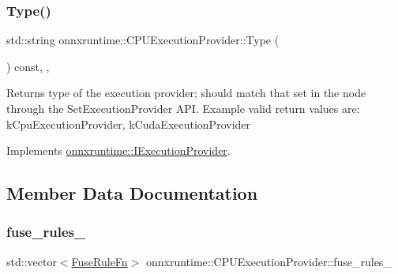 \mbox{\label{classonnxruntime_1_1CPUExecutionProvider_a419ca314cd97d0561226e90755b29da2}} 
\subsubsection{\texorpdfstring{Type()}{Type()}}
{\footnotesize\ttfamily std\+::string onnxruntime\+::\+C\+P\+U\+Execution\+Provider\+::\+Type (\begin{DoxyParamCaption}{ }\end{DoxyParamCaption}) const\hspace{0.3cm}{\ttfamily [inline]}, {\ttfamily [override]}, {\ttfamily [virtual]}}

\begin{DoxyReturn}{Returns}
type of the execution provider; should match that set in the node through the Set\+Execution\+Provider A\+PI. Example valid return values are\+: k\+Cpu\+Execution\+Provider, k\+Cuda\+Execution\+Provider 
\end{DoxyReturn}


Implements \mbox{\hyperlink{classonnxruntime_1_1IExecutionProvider_a6bfeb7af172299bcc6083a418b01fac1}{onnxruntime\+::\+I\+Execution\+Provider}}.



\subsection{Member Data Documentation}
\mbox{\label{classonnxruntime_1_1CPUExecutionProvider_a193342bb5a357f5dc4191c671042aaeb}} 
\subsubsection{\texorpdfstring{fuse\+\_\+rules\+\_\+}{fuse\_rules\_}}
{\footnotesize\ttfamily std\+::vector$<$\mbox{\hyperlink{namespaceonnxruntime_a916d9c71f5b38a56c21340f816954b88}{Fuse\+Rule\+Fn}}$>$ onnxruntime\+::\+C\+P\+U\+Execution\+Provider\+::fuse\+\_\+rules\+\_\+\hspace{0.3cm}{\ttfamily [protected]}}



